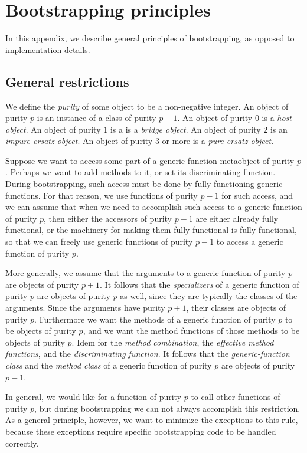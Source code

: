 \chapter{Bootstrapping principles}

In this appendix, we describe general principles of bootstrapping, as
opposed to implementation details.

\section{General restrictions}

We define the \emph{purity} of some object to be a non-negative
integer.  An object of purity $p$ is an instance of a class of purity
$p-1$.  An object of purity $0$ is a \emph{host object}.  An object of
purity $1$ is a is a \emph{bridge object}.  An object of purity $2$ is
an \emph{impure ersatz object}.  An object of purity $3$ or more is a
\emph{pure ersatz object}.

Suppose we want to access some part of a generic function metaobject
of purity $p$.  Perhaps we want to add methods to it, or set its
discriminating function.  During bootstrapping, such access must be
done by fully functioning generic functions.  For that reason, we use
functions of purity $p-1$ for such access, and we can assume that when
we need to accomplish such access to a generic function of purity $p$,
then either the accessors of purity $p-1$ are either already fully
functional, or the machinery for making them fully functional is fully
functional, so that we can freely use generic functions of purity
$p-1$ to access a generic function of purity $p$.

More generally, we assume that the arguments to a generic function of
purity $p$ are objects of purity $p+1$.  It follows that the
\emph{specializers} of a generic function of purity $p$ are objects of
purity $p$ as well, since they are typically the classes of the
arguments.  Since the arguments have purity $p+1$, their classes are
objects of purity $p$.  Furthermore we want the methods of a generic
function of purity $p$ to be objects of purity $p$, and we want the
method functions of those methods to be objects of purity $p$.  Idem
for the \emph{method combination}, the \emph{effective method
  functions}, and the \emph{discriminating function}.  It follows that
the \emph{generic-function class} and the \emph{method class} of a
generic function of purity $p$ are objects of purity $p-1$.

In general, we would like for a function of purity $p$ to call other
functions of purity $p$, but during bootstrapping we can not always
accomplish this restriction.  As a general principle, however, we want
to minimize the exceptions to this rule, because these exceptions
require specific bootstrapping code to be handled correctly.

